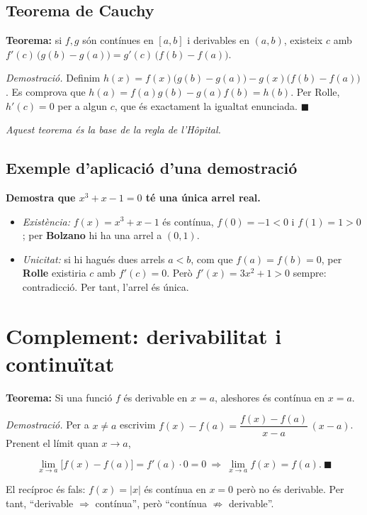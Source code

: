 \subsection{Teorema de Cauchy}

\textbf{Teorema:} si $f,g$ són contínues en $[a,b]$ i derivables en $(a,b)$, existeix $c$ amb $f'(c)\,\bigl(g(b)-g(a)\bigr)=g'(c)\,\bigl(f(b)-f(a)\bigr)$.

\emph{Demostració.} Definim $h(x)=f(x)\bigl(g(b)-g(a)\bigr)-g(x)\bigl(f(b)-f(a)\bigr)$. Es comprova que $h(a)=f(a)g(b)-g(a)f(b)=h(b)$. Per Rolle, $h'(c)=0$ per a algun $c$, que és exactament la igualtat enunciada. $\blacksquare$

\emph{Aquest teorema és la base de la regla de l'Hôpital.}

\subsection{Exemple d'aplicació d'una demostració}

\textbf{Demostra que $x^3+x-1=0$ té una única arrel real.}

\begin{itemize}
\item \emph{Existència:} $f(x)=x^3+x-1$ és contínua, $f(0)=-1<0$ i $f(1)=1>0$; per \textbf{Bolzano} hi ha una arrel a $(0,1)$.
\item \emph{Unicitat:} si hi hagués dues arrels $a<b$, com que $f(a)=f(b)=0$, per \textbf{Rolle} existiria $c$ amb $f'(c)=0$. Però $f'(x)=3x^2+1>0$ sempre: contradicció. Per tant, l'arrel és única.
\end{itemize}

\section{Complement: derivabilitat i continuïtat}

\textbf{Teorema:} Si una funció $f$ és derivable en $x=a$, aleshores és contínua en $x=a$.

\emph{Demostració.} Per a $x\neq a$ escrivim $f(x)-f(a)=\dfrac{f(x)-f(a)}{x-a}\,(x-a)$. Prenent el límit quan $x\to a$,

\begin{equation*}
\lim_{x\to a}\bigl[f(x)-f(a)\bigr]=f'(a)\cdot0=0\ \Longrightarrow\ \lim_{x\to a}f(x)=f(a).\ \blacksquare
\end{equation*}

El recíproc és fals: $f(x)=|x|$ és contínua en $x=0$ però no és derivable. Per tant, ``derivable $\Rightarrow$ contínua'', però ``contínua $\not\Rightarrow$ derivable''.

